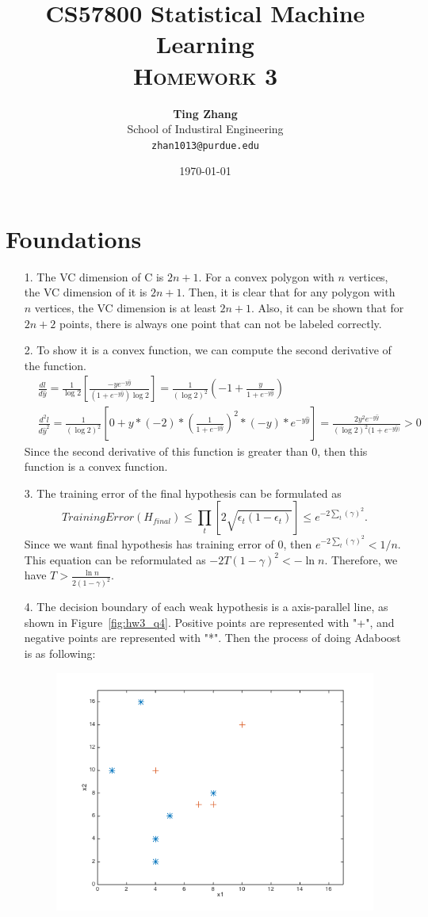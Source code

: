 \documentclass[11pt]{article}
\title{
\textbf{CS57800 Statistical Machine Learning} \\ \textsc{Homework 3} \\
\normalsize\vspace{0.1in}
}
\author{
	\textbf{Ting Zhang} \\
	School of Industiral Engineering\\
	\texttt{zhan1013@purdue.edu}
}
\date{\today}
\begin{document}
\maketitle

\section{Foundations}
\begin{itemize}
\item[1.]
The VC dimension of C is \(2n+1\). For a convex polygon with \(n\) vertices, the VC dimension of it is \(2n+1\). Then, it is clear that for any polygon with \(n\) vertices, the VC dimension is at least \(2n+1\). Also, it can be shown that for \(2n+2\) points, there is always one point that can not be labeled correctly.
\item[2.] To show it is a convex function, we can compute the second derivative of the function.
\begin{align*}
& \frac{dl}{d\hat{y}} = \frac{1}{\log 2}[\frac{-ye^{-y\hat{y}}}{(1+e^{-y\hat{y}}) \log 2}] = \frac{1}{(\log 2)^2} (-1 + \frac{y}{1+e^{-y\hat{y}}})  \\
& \frac{d^2l}{d\hat{y}^2} =  \frac{1}{(\log 2)^2}[0 + y*(-2)*(\frac{1}{1+e^{-y\hat{y}}})^2 * (-y) * e^{-y\hat{y}}] = \frac{2y^2e^{-y\hat{y}}}{(\log 2)^2 (1+e^{-y\hat{y})}} > 0
\end{align*}
Since the second derivative of this function is greater than 0, then this function is a convex function.
\item[3.] The training error of the final hypothesis can be formulated as
\begin{equation*}
TrainingError(H_{final}) \leq \prod_{t} [2 \sqrt{\epsilon_t(1-\epsilon_t)}] \leq e^{-2 \sum_{t} (\gamma)^2}.
\end{equation*}
Since we want final hypothesis has training error of 0, then \(e^{-2 \sum_{t} (\gamma)^2} < 1/n\). This equation can be reformulated as \(-2T (1-\gamma)^2<-\ln n\). Therefore, we have \(T>\frac{\ln n}{2(1-\gamma)^2}\).
\item[4.] The decision boundary of each weak hypothesis is a axis-parallel line, as shown in Figure~\ref{fig:hw3_q4}. Positive points are represented with "+", and negative points are represented with "*". Then the process of doing Adaboost is as following: \\
\begin{figure}[!ht]
  \centering 
  \includegraphics[width=0.5\columnwidth]{hw3_q4.png}%

\end{figure}
\end{itemize}
\end{document}

